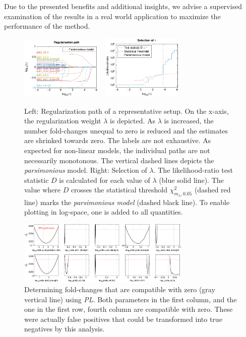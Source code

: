 \documentclass{bioinfo}
\begin{document}
Due to the presented benefits and additional insights, we advise a supervised examination of the results in a real world application to maximize the performance of the method.

\begin{figure}[!tpb]%
\centerline{\includegraphics[width=110pt]{Figures/l1_tree.pdf}~~\includegraphics[width=110pt]{Figures/l1_selection.pdf}}
\caption{Left: Regularization path of a representative setup. On the x-axis, the regularization weight $\lambda$ is depicted. As $\lambda$ is increased, the number fold-changes unequal to zero is reduced and the estimates are shrinked towards zero. The labels are not exhaustive. As expected for non-linear models, the individual paths are not necessarily monotonous. The vertical dashed lines depicts the \emph{parsimonious} model. Right: Selection of $\lambda$. The likelihood-ratio test statistic $D$ is calculated for each value of $\lambda$ (blue solid line). The value where $D$ crosses the statistical threshold $\chi^2_{m_\lambda,0.05}$ (dashed red line) marks the \emph{parsimonious model} (dashed black line). To enable plotting in log-space, one is added to all quantities.}\label{fig:05}
\end{figure}

\begin{figure}[!tpb]%
\centerline{\includegraphics[width=235pt]{Figures/multi_plot.pdf}}
\caption{Determining fold-changes that are compatible with zero (gray vertical line) using \emph{PL}. Both parameters in the first column, and the one in the first row, fourth column are compatible with zero. These were actually false positives that could be transformed into true negatives by this analysis.}\label{fig:06}
\end{figure}
\end{document}
